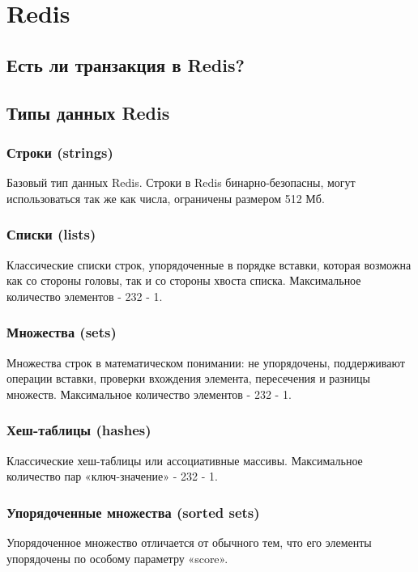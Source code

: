 \chapter{Redis}

\section{Есть ли транзакция в Redis?}
\section{Типы данных Redis}
\subsection{Строки (strings)}
Базовый тип данных Redis. Строки в Redis бинарно-безопасны, могут использоваться так же как числа, ограничены размером 512 Мб.
\subsection{Списки (lists)}
Классические списки строк, упорядоченные в порядке вставки, которая возможна как со стороны головы, так и со стороны хвоста списка. Максимальное количество элементов - 232 - 1.
\subsection{Множества (sets)}    
Множества строк в математическом понимании: не упорядочены, поддерживают операции вставки, проверки вхождения элемента, пересечения и разницы множеств. Максимальное количество элементов - 232 - 1.
\subsection{Хеш-таблицы (hashes)}    
Классические хеш-таблицы или ассоциативные массивы. Максимальное количество пар «ключ-значение» - 232 - 1.
\subsection{Упорядоченные множества (sorted sets)}
Упорядоченное множество отличается от обычного тем, что его элементы упорядочены по особому параметру «score».
